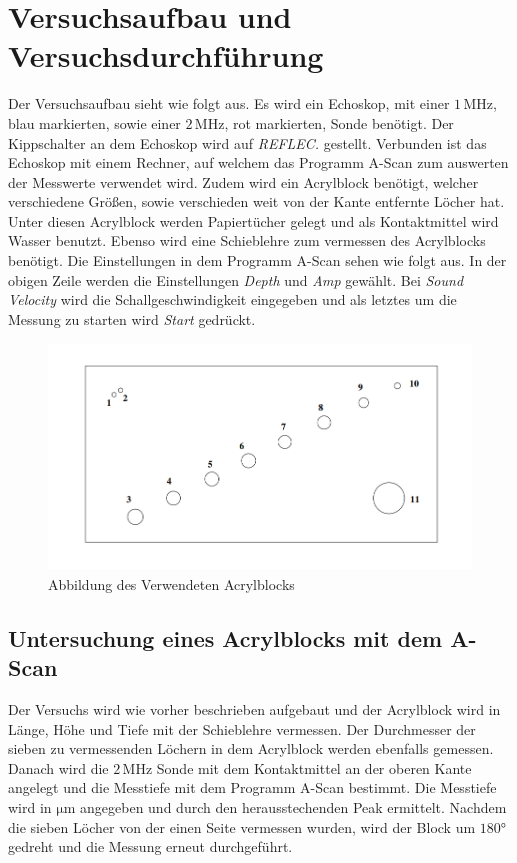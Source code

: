 \section{Versuchsaufbau und Versuchsdurchführung}

\begin{flushleft}
    Der Versuchsaufbau sieht wie folgt aus.
    Es wird ein Echoskop, mit einer $1\,\unit{\mega\hertz}$, blau markierten, sowie einer $2\,\unit{\mega\hertz}$, rot markierten, Sonde benötigt.
    Der Kippschalter an dem Echoskop wird auf \textit{REFLEC.} gestellt.
    Verbunden ist das Echoskop mit einem Rechner, auf welchem das Programm A-Scan zum auswerten der Messwerte verwendet wird.
    Zudem wird ein Acrylblock benötigt, welcher verschiedene Größen, sowie verschieden weit von der Kante entfernte Löcher hat.
    Unter diesen Acrylblock werden Papiertücher gelegt und als Kontaktmittel wird Wasser benutzt.
    Ebenso wird eine Schieblehre zum vermessen des Acrylblocks benötigt.
    Die Einstellungen in dem Programm A-Scan sehen wie folgt aus.
    In der obigen Zeile werden die Einstellungen \textit{Depth} und \textit{Amp} gewählt. 
    Bei \textit{Sound Velocity} wird die Schallgeschwindigkeit eingegeben und als letztes um die Messung zu starten wird \textit{Start} gedrückt.
\end{flushleft}

\begin{figure}[H]
    \centering
    \includegraphics[height=60mm]{bilder/block.png}
    \caption{ Abbildung des Verwendeten Acrylblocks \label{Abbildung1}}
\end{figure}

\subsection{Untersuchung eines Acrylblocks mit dem A-Scan}

\begin{flushleft}
    Der Versuchs wird wie vorher beschrieben aufgebaut und der Acrylblock wird in Länge, Höhe und Tiefe mit der Schieblehre vermessen.
    Der Durchmesser der sieben zu vermessenden Löchern in dem Acrylblock werden ebenfalls gemessen.
    Danach wird die $2\,\unit{\mega\hertz}$ Sonde mit dem Kontaktmittel an der oberen Kante angelegt und die Messtiefe mit dem Programm A-Scan bestimmt.
    Die Messtiefe wird in $\unit{\micro\meter}$ angegeben und durch den herausstechenden Peak ermittelt.
    Nachdem die sieben Löcher von der einen Seite vermessen wurden, wird der Block um $180\unit{\degree}$ gedreht und die Messung erneut durchgeführt. 
\end{flushleft}


